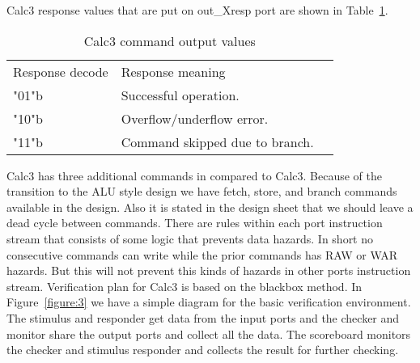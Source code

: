 \documentclass[a4paper, 11pt]{article}
\begin{document}
Calc3 response values that are put on out\_Xresp port are shown in
Table~\ref{table:2}.
\begin{table}[H]
    \centering
    \begin{tabular}{lp{12cm}l}
        \toprule
        Response decode & Response meaning\\
        \cmidrule(r){1-1}\cmidrule(lr){2-2}
        "01"b & Successful operation.\\
        "10"b & Overflow/underflow error.\\
        "11"b & Command skipped due to branch.\\
        \bottomrule
    \end{tabular}
    \caption{Calc3 command output values}
    \label{table:2}
\end{table}
Calc3 has three additional commands in compared to Calc3. Because of the
transition to the ALU style design we have fetch, store, and branch commands
available in the design. Also it is stated in the design sheet that we should
leave a dead cycle between commands. There are rules within each port
instruction stream that consists of some logic that prevents data hazards.
In short no consecutive commands can write while the prior commands has
RAW or WAR hazards. But this will not prevent this kinds of hazards in other
ports instruction stream.
Verification plan for Calc3 is based on the blackbox method. In 
Figure~\ref{figure:3} we have a simple diagram for the basic verification
environment. The stimulus and responder get data from the input ports and
the checker and monitor share the output ports and collect all the data.
The scoreboard monitors the checker and stimulus responder and collects the
result for further checking.
\end{document}
